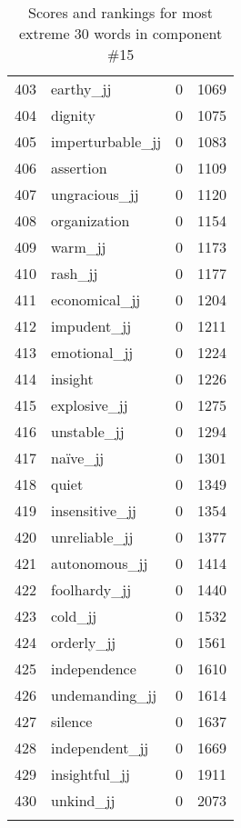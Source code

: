 \begin{longtable}[!htbp]{| rlr@{.}l |}
    403 & earthy\_jj & 0 & 1069 \\
    404 & dignity & 0 & 1075 \\
    405 & imperturbable\_jj & 0 & 1083 \\
    406 & assertion & 0 & 1109 \\
    407 & ungracious\_jj & 0 & 1120 \\
    408 & organization & 0 & 1154 \\
    409 & warm\_jj & 0 & 1173 \\
    410 & rash\_jj & 0 & 1177 \\
    411 & economical\_jj & 0 & 1204 \\
    412 & impudent\_jj & 0 & 1211 \\
    413 & emotional\_jj & 0 & 1224 \\
    414 & insight & 0 & 1226 \\
    415 & explosive\_jj & 0 & 1275 \\
    416 & unstable\_jj & 0 & 1294 \\
    417 & naïve\_jj & 0 & 1301 \\
    418 & quiet & 0 & 1349 \\
    419 & insensitive\_jj & 0 & 1354 \\
    420 & unreliable\_jj & 0 & 1377 \\
    421 & autonomous\_jj & 0 & 1414 \\
    422 & foolhardy\_jj & 0 & 1440 \\
    423 & cold\_jj & 0 & 1532 \\
    424 & orderly\_jj & 0 & 1561 \\
    425 & independence & 0 & 1610 \\
    426 & undemanding\_jj & 0 & 1614 \\
    427 & silence & 0 & 1637 \\
    428 & independent\_jj & 0 & 1669 \\
    429 & insightful\_jj & 0 & 1911 \\
    430 & unkind\_jj & 0 & 2073 \\
    \hline
    \caption{Scores and rankings for most extreme 30 words in component \#15} \\
\end{longtable}
